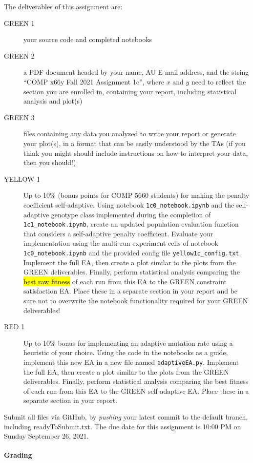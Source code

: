 \documentclass{article}
\begin{document}
The deliverables of this assignment are:
\begin{description}
\item[GREEN 1] your source code and completed notebooks
\item[GREEN 2] a PDF document headed by your name, AU E-mail address, and the string ``COMP x66y Fall 2021 Assignment 1c'', where $x$ and $y$ need to reflect the section you are enrolled in, containing your report, including statistical analysis and plot(s)
\item[GREEN 3] files containing any data you analyzed to write your report or generate your plot(s), in a format that can be easily understood by the TAs (if you think you might should include instructions on how to interpret your data, then you should!)
\item[YELLOW 1] Up to 10\% (bonus points for COMP 5660 students) for making the penalty coefficient self-adaptive. Using notebook \texttt{1c0\_notebook.ipynb} and the self-adaptive genotype class implemented during the completion of \texttt{1c1\_notebook.ipynb}, create an updated population evaluation function that considers a self-adaptive penalty coefficient. Evaluate your implementation using the multi-run experiment cells of notebook \texttt{1c0\_notebook.ipynb} and the provided config file \texttt{yellow1c\_config.txt}. Implement the full EA, then create a plot similar to the plots from the GREEN deliverables. Finally, perform statistical analysis comparing the \hl{best raw fitness} of each run from this EA to the GREEN constraint satisfaction EA. Place these in a separate section in your report and be sure not to overwrite the notebook functionality required for your GREEN deliverables!
\item[RED 1] Up to 10\% bonus for implementing an adaptive mutation rate using a heuristic of your choice. Using the code in the notebooks as a guide, implement this new EA in a new file named \texttt{adaptiveEA.py}. Implement the full EA, then create a plot similar to the plots from the GREEN deliverables. Finally, perform statistical analysis comparing the best fitness of each run from this EA to the GREEN self-adaptive EA. Place these in a separate section in your report.
\end{description}
Submit all files via GitHub, by \emph{pushing} your latest commit to the default branch, including readyToSubmit.txt. The due date for this assignment is 10:00 PM on Sunday September 26, 2021.
\\
\\
\textbf{Grading}\\
\end{document}
